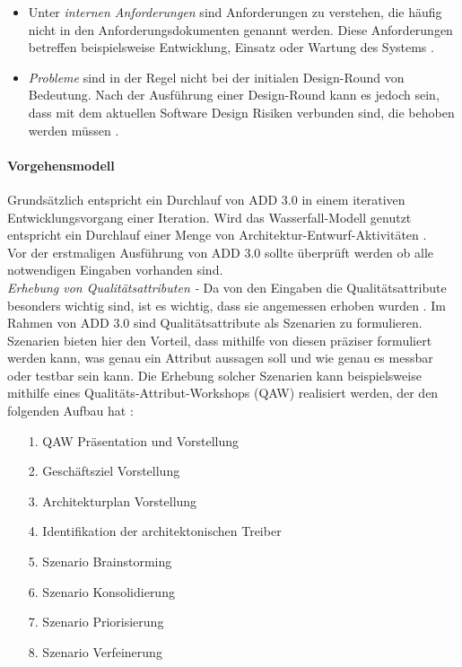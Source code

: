 \begin{itemize}
\begin{itemize}
\item Unter \emph{internen Anforderungen} sind Anforderungen zu verstehen, die h\"aufig nicht in den Anforderungsdokumenten genannt werden. Diese Anforderungen betreffen beispielsweise Entwicklung, Einsatz oder Wartung des Systems \cite{Cer01}.  
\item \emph{Probleme} sind in der Regel nicht bei der initialen Design-Round von Bedeutung. Nach der Ausf\"uhrung einer Design-Round kann es jedoch sein, dass mit dem aktuellen Software Design Risiken verbunden sind, die behoben werden m\"ussen \cite{Cer01}.\\
\end{itemize}
\end{itemize}

\paragraph{Vorgehensmodell}
Grunds\"atzlich entspricht ein Durchlauf von ADD 3.0 in einem iterativen Entwicklungsvorgang einer Iteration. Wird das Wasserfall-Modell genutzt entspricht ein Durchlauf einer Menge von Architektur-Entwurf-Aktivit\"aten \cite{Cer01}.\\

Vor der erstmaligen Ausf\"uhrung von ADD 3.0 sollte \"uberpr\"uft werden ob alle notwendigen Eingaben vorhanden sind.\\

\emph{Erhebung von Qualit\"atsattributen -}
Da von den Eingaben die Qualit\"atsattribute besonders wichtig sind, ist es wichtig, dass sie angemessen erhoben wurden \cite{Cer01}. Im Rahmen von ADD 3.0 sind Qualit\"atsattribute als Szenarien zu formulieren. Szenarien bieten hier den Vorteil, dass mithilfe von diesen pr\"aziser formuliert werden kann, was genau ein Attribut aussagen soll und wie genau es messbar oder testbar sein kann. Die Erhebung solcher Szenarien kann beispielsweise mithilfe eines Qualit\"ats-Attribut-Workshops (QAW) realisiert werden, der den folgenden Aufbau hat \cite{Cer01}:\\

\begin{itemize}
\item[1.] QAW Pr\"asentation und Vorstellung
\item[2.] Gesch\"aftsziel Vorstellung
\item[3.] Architekturplan Vorstellung
\item[4.] Identifikation der architektonischen Treiber
\item[5.] Szenario Brainstorming
\item[6.] Szenario Konsolidierung
\item[7.] Szenario Priorisierung
\item[8.] Szenario Verfeinerung \\
\end{itemize}

